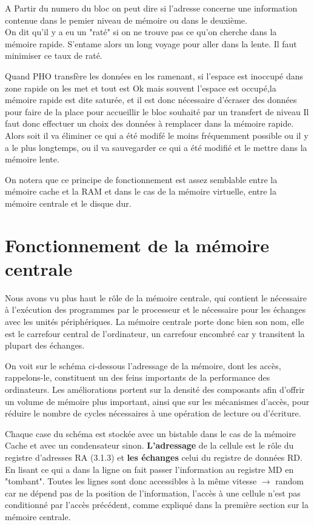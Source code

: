 \documentclass{report}
\begin{document}
{A Partir du numero du bloc on peut dire si l'adresse concerne une information contenue dans le pemier niveau de mémoire ou dans le deuxième.\\
On dit qu'il y a eu un "raté" si on ne trouve pas ce qu'on cherche dans la mémoire rapide. S'entame alors un long voyage pour aller dans la lente. Il faut minimiser ce taux de raté.

Quand PHO transfère les données en les ramenant, si l'espace est inoccupé dans zone rapide on les met et tout est Ok mais souvent l'espace est occupé,la mémoire rapide est dite saturée, et il est donc nécessaire d'écraser des données pour faire de la place pour accueillir le bloc souhaité par un transfert de niveau Il faut donc effectuer un choix des données à remplacer dans la mémoire rapide.
Alors soit il va éliminer ce qui a été modifé le moins fréquemment possible ou il y a le plus longtemps, ou il va sauvegarder ce qui a été modifié et le mettre dans la mémoire lente.


On notera que ce  principe de fonctionnement est assez semblable entre la mémoire cache et la RAM et dans le cas de la mémoire virtuelle, entre la mémoire centrale et le disque dur.



\section{Fonctionnement de la mémoire centrale}

Nous avons vu plus haut le rôle de la mémoire centrale, qui contient le nécessaire à l'exécution des programmes  par le processeur et le nécessaire pour les échanges avec les unités périphériques. La mémoire centrale porte donc bien son nom, elle est le carrefour central de l'ordinateur, un carrefour encombré car y transitent la plupart des échanges.

On voit sur le schéma ci-dessous l'adressage de la mémoire, dont les accès, rappelons-le, constituent un des feins importants de la performance des ordinateurs.
Les améliorations portent sur la densité des composants afin d'offrir un volume de mémoire plus important, ainsi que sur les mécanismes d'accès, pour réduire le nombre de cycles nécessaires à une opération de lecture ou d'écriture.

Chaque case du schéma est stockée avec un bistable dans le cas de la mémoire Cache et avec un condensateur sinon. {\bf L'adressage} de la cellule est le rôle du registre d'adresses RA (3.1.3) et {\bf les échanges } celui du registre de données RD. En lisant ce qui a dans la ligne on fait passer l'information au registre MD en "tombant".  Toutes les lignes sont donc accessibles à la même vitesse $\rightarrow$ random car ne dépend pas de la position de l'information, l'accès à une cellule n'est pas conditionné par l'accès précédent, comme expliqué dans la première section sur la mémoire centrale.

}
\end{document}

